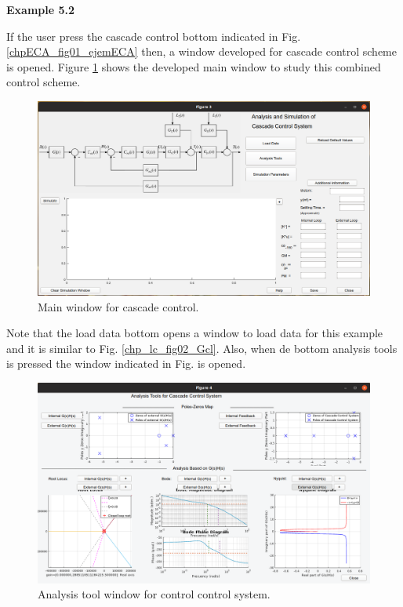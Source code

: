\textbf{Example 5.2}

If the user press the cascade control bottom indicated in Fig. \ref{chpECA_fig01_ejemECA} then, a window developed for cascade control scheme is opened. Figure \ref{chpECA_fig05_ejemECA} shows the developed main window to study this combined control scheme.

\begin{figure}[H]
	\centering
	\includegraphics[scale=0.5]{./figuras/chapter_eca/fig05EjemECA.png}
	\caption{Main window for cascade control.}
	\label{chpECA_fig05_ejemECA}
\end{figure}

Note that the load data bottom opens a window to load data for this example and it is similar to Fig. \ref{chp_lc_fig02_Gcl}. Also, when de bottom analysis tools is pressed the window indicated in Fig. is opened.

\begin{figure}[H]
	\centering
	\includegraphics[scale=0.5]{./figuras/chapter_eca/fig06EjemECA.png}
	\caption{Analysis tool window for control control system.}
	\label{chpECA_fig06_ejemECA}
\end{figure}

